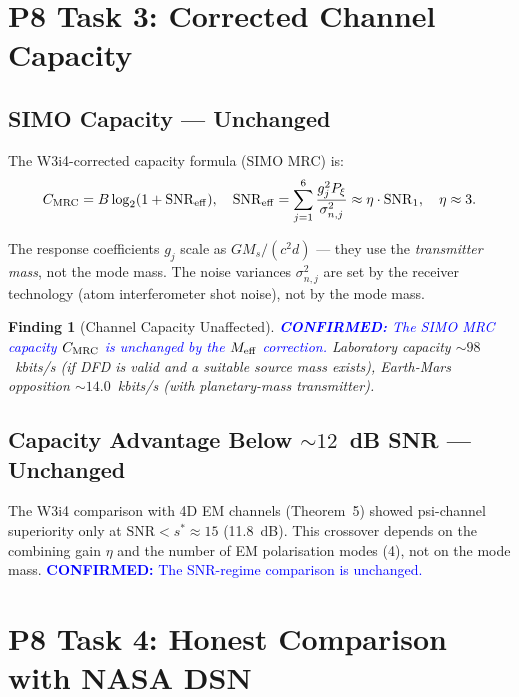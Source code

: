 \documentclass[aps,prd,twocolumn,superscriptaddress,nofootinbib]{revtex4-2}
\newcommand{\SNR}{\mathrm{SNR}}
\newcommand{\confirmed}[1]{\textcolor{blue}{\textbf{CONFIRMED:} #1}}
\newtheorem{finding}{Finding}
\begin{document}
\section{P8 Task 3: Corrected Channel Capacity}
\label{sec:capacity}

\subsection{SIMO Capacity --- Unchanged}

The W3i4-corrected capacity formula (SIMO MRC) is:
\begin{equation}
C_{\rm MRC} = B\log_2(1 + \SNR_{\rm eff}),
\quad \SNR_{\rm eff} = \sum_{j=1}^6 \frac{g_j^2 P_\xi}{\sigma_{n,j}^2}
\approx \eta \cdot \SNR_1, \quad \eta \approx 3.
\label{eq:C-MRC}
\end{equation}

The response coefficients $g_j$ scale as $G M_s / (c^2 d)$ --- they
use the \emph{transmitter mass}, not the mode mass. The noise variances
$\sigma_{n,j}^2$ are set by the receiver technology (atom interferometer
shot noise), not by the mode mass.

\begin{finding}[Channel Capacity Unaffected]
\label{find:capacity}
\confirmed{The SIMO MRC capacity $C_{\rm MRC}$ is unchanged by the
$M_{\rm eff}$ correction.} Laboratory capacity $\sim 98$~kbits/s
(if DFD is valid and a suitable source mass exists), Earth-Mars
opposition $\sim 14.0$~kbits/s (with planetary-mass transmitter).
\end{finding}

\subsection{Capacity Advantage Below $\sim 12$~dB SNR --- Unchanged}

The W3i4 comparison with 4D EM channels (Theorem~5) showed psi-channel
superiority only at $\SNR < s^* \approx 15$ (11.8~dB). This crossover
depends on the combining gain $\eta$ and the number of EM polarisation
modes (4), not on the mode mass. \confirmed{The SNR-regime comparison
is unchanged.}

\section{P8 Task 4: Honest Comparison with NASA DSN}
\label{sec:dsn}
\end{document}
